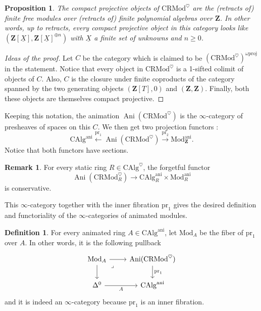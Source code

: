 \documentclass[11pt]{article}
\newtheorem{proposition}[theorem]{Proposition}
\theoremstyle{definition}
\newtheorem{definition}[theorem]{Definition}
\newtheorem{remark}[theorem]{Remark}
\newcommand{\Ani}{\operatorname{Ani}}
\newcommand{\ani}{\mathrm{ani}}
\newcommand{\CAlg}{\mathrm{CAlg}}
\newcommand{\CRMod}{\mathrm{CRMod}}
\newcommand{\heart}{\heartsuit}
\newcommand{\Mod}{\mathrm{Mod}}
\newcommand{\pr}{\mathrm{pr}}
\newcommand{\proj}{\mathrm{proj}}
\newcommand{\Z}{\mathbf{Z}}
\begin{document}
\begin{proposition}
    The compact projective objects of $\CRMod^{\heart}$ are the (retracts of) finite free modules over (retracts of) finite polynomial algebras over $\Z$.
    In other words, up to retracts, every compact projective object in this category looks like $(\Z[\underline{X}], \Z[\underline{X}]^{\oplus n})$ with $\underline{X}$ a finite set of unknowns and $n \geqslant 0$.
\end{proposition}
\begin{proof}[Ideas of the proof]
    Let $C$ be the category which is claimed to be $(\CRMod^{\heart})^{\omega\proj}$ in the statement.
    Notice that every object in $\CRMod^{\heart}$ is a 1-sifted colimit of objects of $C$.
    Also, $C$ is the closure under finite coproducts of the category spanned by the two generating objects $(\Z[T], 0)$ and $(\Z, \Z)$.
    Finally, both these objects are themselves compact projective.
\end{proof}

Keeping this notation, the animation $\Ani(\CRMod^{\heart})$ is the $\infty$-category of presheaves of spaces on this $C$.
We then get two projection functors :
\[
    \CAlg^{\ani} \xleftarrow{\pr_1} \Ani(\CRMod^{\heart}) \xrightarrow{\pr_2} \Mod_{\Z}^{\ani}.
\]
Notice that both functors have sections.

\begin{remark}
    For every static ring $R \in \CAlg^{\heart}$, the forgetful functor
    \[
        \Ani(\CRMod^{\heart}_R) \to \CAlg_R^{\ani} \times \Mod_R^{\ani}
    \]
    is conservative.
\end{remark}

This $\infty$-category together with the inner fibration $\pr_1$ gives the desired definition and functoriality of the $\infty$-categories of animated modules.

\begin{definition}
    For every animated ring $A \in \CAlg^{\ani}$, let $\Mod_A$ be the fiber of $\pr_1$ over $A$.
    In other words, it is the following pullback
    \[\begin{tikzcd}
        {\Mod_A} & {\Ani(\CRMod^{\heart})} \\
        {\Delta^0} & {\CAlg^{\ani}}
        \arrow[from=1-1, to=1-2]
        \arrow[from=1-1, to=2-1]
        \arrow["\lrcorner"{anchor=center, pos=0.125}, draw=none, from=1-1, to=2-2]
        \arrow["{\pr_1}", from=1-2, to=2-2]
        \arrow["A"', from=2-1, to=2-2]
    \end{tikzcd}\]
    and it is indeed an $\infty$-category because $\pr_1$ is an inner fibration.
\end{definition}
\end{document}
